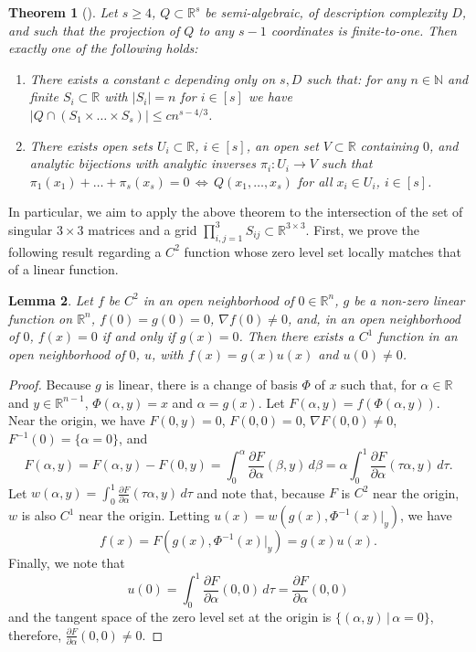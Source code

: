 \documentclass[reqno]{amsart}
\numberwithin{equation}{section}
\newcommand\R{\mathbb{R}}
\newtheorem{theorem}{Theorem}[section]
\newtheorem{lemma}[theorem]{Lemma}
\begin{document}
\begin{theorem}[{\cite[Theorem A]{chernikov2024model}}]\label{thm:semi_alg}
Let $s \ge 4$, $Q \subset \R^{s}$ be semi-algebraic, of description complexity $D$, and such that the projection of $Q$ to any $s-1$ coordinates is finite-to-one. Then exactly one of the following holds:
\begin{enumerate}
    \item There exists a constant $c$ depending only on $s,D$ such that: for any $n \in \mathbb{N}$ and finite $S_i \subset \R$ with $|S_i| = n$ for $i \in [s]$ we have $|Q \cap (S_1 \times \ldots \times S_s)| \le c n^{s-4/3}$. 
    \item There exists open sets $U_i \subset \mathbb{R}$, $i \in [s]$, an open set $V \subset \mathbb{R}$ containing $0$, and analytic bijections with analytic inverses $\pi_i:U_i \rightarrow V$ such that
   $\pi_1(x_1) + \ldots + \pi_s(x_s) = 0 \, \Leftrightarrow \, Q(x_1,\ldots,x_s)$
    for all $x_i \in U_i$, $i \in [s]$.
\end{enumerate}
\end{theorem}

In particular, we aim to apply the above theorem to the intersection of the set of singular $3\times 3$ matrices and a grid $ \prod_{i,j=1}^3 S_{ij} \subset \mathbb{R}^{3 \times 3}$. First, we prove the following result regarding a $C^2$ function whose zero level set locally matches that of a linear function.

\begin{lemma}\label{lm:linear}
Let $f$ be $C^2$ in an open neighborhood of $0 \in \mathbb{R}^n$, $g$ be a non-zero linear function on $\mathbb{R}^n$, $f(0) = g(0) = 0$, $\nabla f(0) \ne 0$, and, in an open neighborhood of $0$, $f(x) = 0$ if and only if $g(x) = 0$. Then there exists a $C^1$ function in an open neighborhood of $0$, $u$, with $f(x) = g(x) u(x)$ and $u(0) \ne 0$.
\end{lemma}

\begin{proof}
Because $g$ is linear, there is a change of basis $\Phi$ of $x$ such that, for $\alpha \in \mathbb{R}$ and $y \in \mathbb{R}^{n-1}$, $\Phi(\alpha,y) = x$ and $\alpha = g(x)$. Let $F(\alpha,y) = f(\Phi(\alpha,y))$. Near the origin, we have $F(0,y) = 0$, $F(0,0) = 0$, $\nabla F(0,0) \ne 0$, $F^{-1}(0) = \{\alpha = 0\}$, and 
\[F(\alpha,y) = F(\alpha,y) - F(0,y) = \int_{0}^\alpha \frac{\partial F}{\partial \alpha} (\beta,y) \, d \beta = \alpha \int_{0}^1 \frac{\partial F}{\partial \alpha} (\tau \alpha, y) \, d \tau. \]
Let $w(\alpha,y) = \int_{0}^1 \frac{\partial F}{\partial \alpha} (\tau \alpha, y) \, d \tau$ and note that, because $F$ is $C^2$ near the origin, $w$ is also $C^1$ near the origin. Letting $u(x) = w(g(x),\Phi^{-1}(x)|_{y})$, we have
\[f(x) = F(g(x),\Phi^{-1}(x)|_{y}) = g(x) u(x). \]
Finally, we note that
\[u(0) = \int_{0}^1\frac{\partial F}{\partial \alpha} (0, 0) \, d \tau = \frac{\partial F}{\partial \alpha} (0, 0)\]
and the tangent space of the zero level set at the origin is $\{ (\alpha, y) \, | \, \alpha = 0\}$, therefore, $\frac{\partial F}{\partial \alpha} (0, 0) \ne 0$.
\end{proof}
\end{document}
